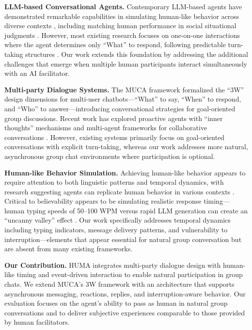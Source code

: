 \documentclass[twocolumn,10pt]{article}
\begin{document}
\textbf{LLM-based Conversational Agents.} Contemporary LLM-based agents have demonstrated remarkable capabilities in simulating human-like behavior across diverse contexts \cite{park2023generative,zhao2025agentsociety,wang2024llmagent}, including matching human performance in social situational judgments \cite{zhao2024llmsocial}. However, most existing research focuses on one-on-one interactions where the agent determines only ``What'' to respond, following predictable turn-taking structures \cite{shuster2023multiparty,addlesee2023designing,weizenbaum1966eliza}. Our work extends this foundation by addressing the additional challenges that emerge when multiple human participants interact simultaneously with an AI facilitator.

\textbf{Multi-party Dialogue Systems.} The MUCA framework \cite{mao2024muca} formalized the ``3W'' design dimensions for multi-user chatbots—``What'' to say, ``When'' to respond, and ``Who'' to answer—introducing conversational strategies for goal-oriented group discussions. Recent work has explored proactive agents with ``inner thoughts'' mechanisms \cite{zhang2025proactive} and multi-agent frameworks for collaborative conversations \cite{chen2024captain,wu2023autogen}. However, existing systems primarily focus on goal-oriented conversations with explicit turn-taking, whereas our work addresses more natural, asynchronous group chat environments where participation is optional.

\textbf{Human-like Behavior Simulation.} Achieving human-like behavior appears to require attention to both linguistic patterns and temporal dynamics, with research suggesting agents can replicate human behavior in various contexts \cite{park2023generative,wang2024recagent,zhang2024generative}. Critical to believability appears to be simulating realistic response timing—human typing speeds of 50–100 WPM versus rapid LLM generation can create an ``uncanny valley'' effect \cite{typing2023average,tenbosch2005pauses,replika2023study}. Our work specifically addresses temporal dynamics including typing indicators, message delivery patterns, and vulnerability to interruption—elements that appear essential for natural group conversation but are absent from many existing frameworks.

\textbf{Our Contribution.} HUMA integrates multi-party dialogue design with human-like timing and event-driven interaction to enable natural participation in group chats. We extend MUCA's 3W framework with an architecture that supports asynchronous messaging, reactions, replies, and interruption-aware behavior. Our evaluation focuses on the agent's ability to pass as human in natural group conversations and to deliver subjective experiences comparable to those provided by human facilitators.
\end{document}
